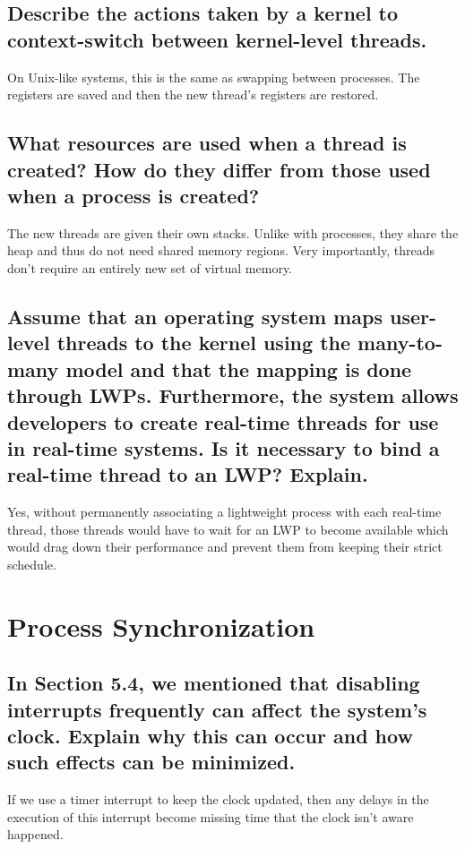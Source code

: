 \documentclass{book}%
\begin{document}
\section{Describe the actions taken by a kernel to context-switch between kernel-level threads.}
On Unix-like systems, this is the same as swapping between processes. The registers are saved and then the new thread's registers are restored.
\section{What resources are used when a thread is created? How do they differ from those used when a process is created?}
The new threads are given their own stacks. Unlike with processes, they share the heap and thus do not need shared memory regions. Very importantly, threads don't require an entirely new set of virtual memory.
\section{Assume that an operating system maps user-level threads to the kernel using the many-to-many model and that the mapping is done through LWPs. Furthermore, the system allows developers to create real-time threads for use in real-time systems. Is it necessary to bind a real-time thread to an LWP? Explain.}
Yes, without permanently associating a lightweight process with each real-time thread, those threads would have to wait for an LWP to become available which would drag down their performance and prevent them from keeping their strict schedule.
\chapter{Process Synchronization}
\section{In Section 5.4, we mentioned that disabling interrupts frequently can affect the system's clock. Explain why this can occur and how such effects can be minimized.}
If we use a timer interrupt to keep the clock updated, then any delays in the execution of this interrupt become missing time that the clock isn't aware happened.
\end{document}
